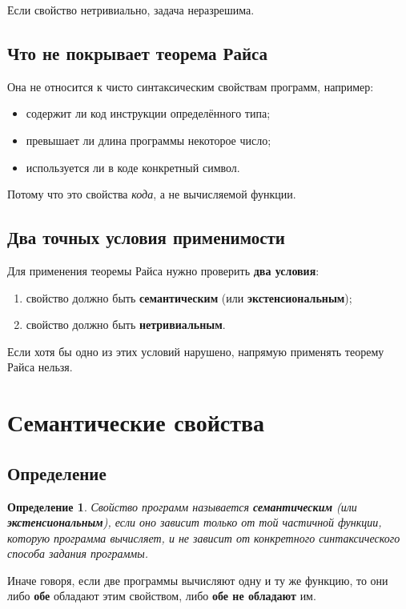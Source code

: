 \documentclass[12pt,a4paper]{article}
\newtheorem{definition}{Определение}
\begin{document}
Если свойство нетривиально, задача неразрешима.

\subsection{Что не покрывает теорема Райса}
Она не относится к чисто синтаксическим свойствам программ, например:
\begin{itemize}
    \item содержит ли код инструкции определённого типа;
    \item превышает ли длина программы некоторое число;
    \item используется ли в коде конкретный символ.
\end{itemize}

Потому что это свойства \emph{кода}, а не вычисляемой функции.

\subsection{Два точных условия применимости}
Для применения теоремы Райса нужно проверить \textbf{два условия}:

\begin{enumerate}
    \item свойство должно быть \textbf{семантическим} (или \textbf{экстенсиональным});
    \item свойство должно быть \textbf{нетривиальным}.
\end{enumerate}

Если хотя бы одно из этих условий нарушено, напрямую применять теорему Райса нельзя.

\section{Семантические свойства}

\subsection{Определение}
\begin{definition}
Свойство программ называется \textbf{семантическим} (или \textbf{экстенсиональным}), если оно зависит только от той частичной функции, которую программа вычисляет, и не зависит от конкретного синтаксического способа задания программы.
\end{definition}

Иначе говоря, если две программы вычисляют одну и ту же функцию, то они либо \textbf{обе} обладают этим свойством, либо \textbf{обе не обладают} им.
\end{document}
